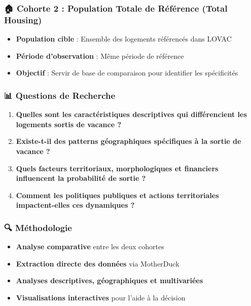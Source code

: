 \documentclass[11pt]{article}
\providecommand{\tightlist}{%
      \setlength{\itemsep}{0pt}\setlength{\parskip}{0pt}}
\begin{document}
\subsubsection{\texorpdfstring{🏠 \textbf{Cohorte 2 : Population Totale
de Référence (Total
Housing)}}{🏠 Cohorte 2 : Population Totale de Référence (Total Housing)}}\label{cohorte-2-population-totale-de-ruxe9fuxe9rence-total-housing}

\begin{itemize}
\tightlist
\item
  \textbf{Population cible} : Ensemble des logements référencés dans
  LOVAC
\item
  \textbf{Période d'observation} : Même période de référence
\item
  \textbf{Objectif} : Servir de base de comparaison pour identifier les
  spécificités
\end{itemize}

\subsubsection{\texorpdfstring{📊 \textbf{Questions de
Recherche}}{📊 Questions de Recherche}}\label{questions-de-recherche}

\begin{enumerate}
\def\labelenumi{\arabic{enumi}.}
\tightlist
\item
  \textbf{Quelles sont les caractéristiques descriptives qui
  différencient les logements sortis de vacance ?}
\item
  \textbf{Existe-t-il des patterns géographiques spécifiques à la sortie
  de vacance ?}
\item
  \textbf{Quels facteurs territoriaux, morphologiques et financiers
  influencent la probabilité de sortie ?}
\item
  \textbf{Comment les politiques publiques et actions territoriales
  impactent-elles ces dynamiques ?}
\end{enumerate}

\subsubsection{\texorpdfstring{🔍
\textbf{Méthodologie}}{🔍 Méthodologie}}\label{muxe9thodologie}

\begin{itemize}
\tightlist
\item
  \textbf{Analyse comparative} entre les deux cohortes
\item
  \textbf{Extraction directe des données} via MotherDuck
\item
  \textbf{Analyses descriptives, géographiques et multivariées}
\item
  \textbf{Visualisations interactives} pour l'aide à la décision
\end{itemize}
\end{document}
